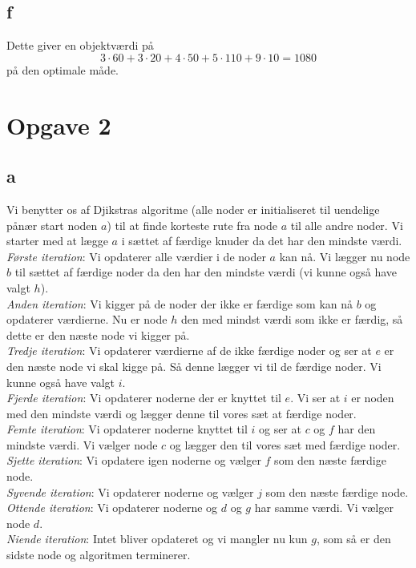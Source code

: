 \documentclass[a4paper]{article}
\begin{document}
\subsection*{f}
Dette giver en objektværdi på 
$$
3\cdot 60+3\cdot20+4\cdot 50+5\cdot 110+9\cdot 10 = 1080
$$
på den optimale måde.

\newpage
\section*{Opgave 2}
\subsection*{a}
Vi benytter os af Djikstras algoritme (alle noder er initialiseret til uendelige pånær start noden $a$) til at finde korteste rute fra node $a$ til alle andre noder. Vi starter med at lægge $a$ i sættet af færdige knuder da det har den mindste værdi.\\
\textit{Første iteration}:
Vi opdaterer alle værdier i de noder $a$ kan nå. Vi lægger nu node $b$ til sættet af færdige noder da den har den mindste værdi (vi kunne også have valgt $h$).\\
\textit{Anden iteration}:
Vi kigger på de noder der ikke er færdige som kan nå $b$ og opdaterer værdierne. Nu er node $h$ den med mindst værdi som ikke er færdig, så dette er den næste node vi kigger på. \\
\textit{Tredje iteration}:
Vi opdaterer værdierne af de ikke færdige noder og ser at $e$ er den næste node vi skal kigge på. Så denne lægger vi til de færdige noder. Vi kunne også have valgt $i$.\\
\textit{Fjerde iteration}:
Vi opdaterer noderne der er knyttet til $e$. Vi ser at $i$ er noden med den mindste værdi og lægger denne til vores sæt at færdige noder.\\
\textit{Femte iteration}:
Vi opdaterer noderne knyttet til $i$ og ser at $c$ og $f$ har den mindste værdi. Vi vælger node $c$ og lægger den til vores sæt med færdige noder.\\
\textit{Sjette iteration}:
Vi opdatere igen noderne og vælger $f$ som den næste færdige node.\\
\textit{Syvende iteration}:
Vi opdaterer noderne og vælger $j$ som den næste færdige node.\\
\textit{Ottende iteration}:
Vi opdaterer noderne og $d$ og $g$ har samme værdi. Vi vælger node $d$.\\
\textit{Niende iteration}:
Intet bliver opdateret og vi mangler nu kun $g$, som så er den sidste node og algoritmen terminerer.
\end{document}
